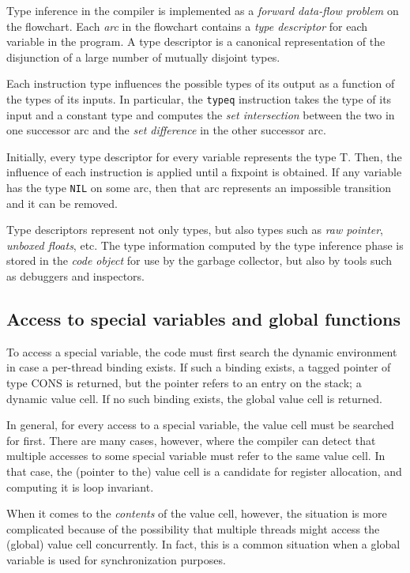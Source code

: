 Type inference in the \sysname{} compiler is implemented as a
\emph{forward data-flow problem} on the flowchart.  Each \emph{arc} in
the flowchart contains a \emph{type descriptor} for each variable in
the program.  A type descriptor is a canonical representation of the
disjunction of a large number of mutually disjoint types.  

Each instruction type influences the possible types of its output as a
function of the types of its inputs.  In particular, the
\texttt{typeq} instruction takes the type of its input and a constant
type and computes the \emph{set intersection}
between the two in one successor arc and the \emph{set difference} in
the other successor arc.  

Initially, every type descriptor for every variable represents the
type T.  Then, the influence of each instruction is applied until
a fixpoint is obtained.  If any variable has the type \texttt{NIL} on
some arc, then that arc represents an impossible transition and it can
be removed. 

Type descriptors represent not only \commonlisp{} types, but also types such
as \emph{raw pointer}, \emph{unboxed floats}, etc.  The type
information computed by the type inference phase is stored in the
\emph{code object} for use by the garbage collector, but also by tools
such as debuggers and inspectors. 

\subsection{Access to special variables and global functions}

To access a special variable, the code must first search the dynamic
environment in case a per-thread binding exists.  If such a binding
exists, a tagged pointer of type CONS is returned, but the pointer
refers to an entry on the stack; a dynamic value cell.  If no such
binding exists, the global value cell is returned.

In general, for every access to a special variable, the value cell
must be searched for first.  There are many cases, however, where the
compiler can detect that multiple accesses to some special variable
must refer to the same value cell.  In that case, the (pointer to the)
value cell is a candidate for register allocation, and computing it is
loop invariant. 

When it comes to the \emph{contents} of the value cell, however, the
situation is more complicated because of the possibility that multiple
threads might access the (global) value cell concurrently.  In fact,
this is a common situation when a global variable is used for
synchronization purposes.

